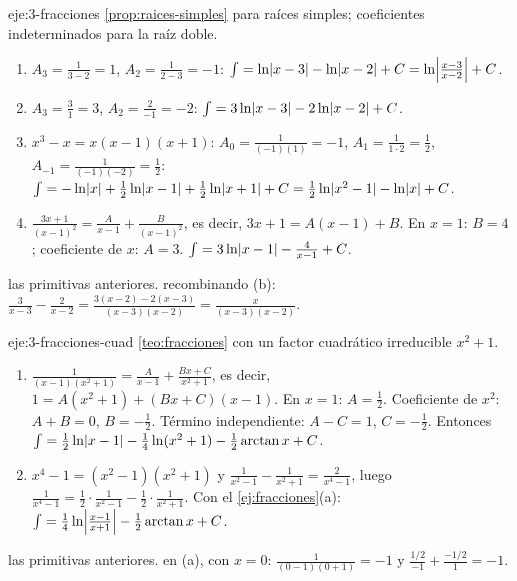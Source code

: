 \begin{solucion}{eje:3-fracciones}
\planteamiento \cref{prop:raices-simples} para raíces simples; coeficientes indeterminados para la raíz doble.
\pasos
\begin{enumerate}[label=(\alph*)]
  \item $A_3=\frac{1}{3-2}=1$, $A_2=\frac{1}{2-3}=-1$: $\int=\ln\lvert x-3\rvert-\ln\lvert x-2\rvert+C=\ln\Bigl|\frac{x-3}{x-2}\Bigr|+C$.
  \item $A_3=\frac{3}{1}=3$, $A_2=\frac{2}{-1}=-2$: $\int=3\ln\lvert x-3\rvert-2\ln\lvert x-2\rvert+C$.
  \item $x^{3}-x=x(x-1)(x+1)$: $A_0=\frac{1}{(-1)(1)}=-1$, $A_1=\frac{1}{1\cdot2}=\frac12$, $A_{-1}=\frac{1}{(-1)(-2)}=\frac12$: $\int=-\ln\lvert x\rvert+\frac12\ln\lvert x-1\rvert+\frac12\ln\lvert x+1\rvert+C=\frac12\ln\lvert x^{2}-1\rvert-\ln\lvert x\rvert+C$.
  \item $\frac{3x+1}{(x-1)^{2}}=\frac{A}{x-1}+\frac{B}{(x-1)^{2}}$, es decir, $3x+1=A(x-1)+B$. En $x=1$: $B=4$; coeficiente de $x$: $A=3$. $\int=3\ln\lvert x-1\rvert-\frac{4}{x-1}+C$.
\end{enumerate}
\resultado las primitivas anteriores.
\comprobacion recombinando (b): $\frac{3}{x-3}-\frac{2}{x-2}=\frac{3(x-2)-2(x-3)}{(x-3)(x-2)}=\frac{x}{(x-3)(x-2)}$.
\end{solucion}

\begin{solucion}{eje:3-fracciones-cuad}
\planteamiento \cref{teo:fracciones} con un factor cuadrático irreducible $x^{2}+1$.
\pasos
\begin{enumerate}[label=(\alph*)]
  \item $\frac{1}{(x-1)(x^{2}+1)}=\frac{A}{x-1}+\frac{Bx+C}{x^{2}+1}$, es decir, $1=A(x^{2}+1)+(Bx+C)(x-1)$. En $x=1$: $A=\frac12$. Coeficiente de $x^{2}$: $A+B=0$, $B=-\frac12$. Término independiente: $A-C=1$, $C=-\frac12$. Entonces
  $\int=\frac12\ln\lvert x-1\rvert-\frac14\ln(x^{2}+1)-\frac12\arctan x+C$.
  \item $x^{4}-1=(x^{2}-1)(x^{2}+1)$ y $\frac{1}{x^{2}-1}-\frac{1}{x^{2}+1}=\frac{2}{x^{4}-1}$, luego $\frac{1}{x^{4}-1}=\frac12\cdot\frac{1}{x^{2}-1}-\frac12\cdot\frac{1}{x^{2}+1}$. Con el \cref{ej:fracciones}(a): $\int=\frac14\ln\Bigl|\frac{x-1}{x+1}\Bigr|-\frac12\arctan x+C$.
\end{enumerate}
\resultado las primitivas anteriores.
\comprobacion en (a), con $x=0$: $\frac{1}{(0-1)(0+1)}=-1$ y $\frac{1/2}{-1}+\frac{-1/2}{1}=-1$.
\end{solucion}

